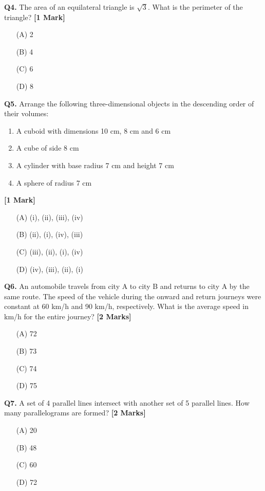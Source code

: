 \documentclass[11pt]{article}
\newcommand{\questiona}[2]{
    \noindent\textbf{Q#2.} #1 \hfill \textbf{[1 Mark]}
}
\newcommand{\questionb}[2]{
    \noindent\textbf{Q#2.} #1 \hfill \textbf{[2 Marks]}
}
\begin{document}
\questiona{The area of an equilateral triangle is \(\sqrt{3}\). What is the perimeter of the triangle?}{4}
\begin{enumerate}
    \item[(A)] 2  
    \item[(B)] 4  
    \item[(C)] 6  
    \item[(D)] 8  
\end{enumerate}
\vspace{0.5cm}

\questiona{Arrange the following three-dimensional objects in the descending order of their volumes:
\begin{enumerate}
    \item A cuboid with dimensions 10 cm, 8 cm and 6 cm
    \item A cube of side 8 cm
    \item A cylinder with base radius 7 cm and height 7 cm
    \item A sphere of radius 7 cm
\end{enumerate}}{5}
\begin{enumerate}
    \item[(A)] (i), (ii), (iii), (iv)  
    \item[(B)] (ii), (i), (iv), (iii)  
    \item[(C)] (iii), (ii), (i), (iv)  
    \item[(D)] (iv), (iii), (ii), (i)  
\end{enumerate}
\vspace{0.5cm}

\questionb{An automobile travels from city A to city B and returns to city A by the same route. The speed of the vehicle during the onward and return journeys were constant at 60 km/h and 90 km/h, respectively. What is the average speed in km/h for the entire journey?}{6}
\begin{enumerate}
    \item[(A)] 72  
    \item[(B)] 73  
    \item[(C)] 74  
    \item[(D)] 75  
\end{enumerate}
\vspace{0.5cm}

\questionb{A set of 4 parallel lines intersect with another set of 5 parallel lines. How many parallelograms are formed?}{7}
\begin{enumerate}
    \item[(A)] 20  
    \item[(B)] 48  
    \item[(C)] 60  
    \item[(D)] 72  
\end{enumerate}
\vspace{0.5cm}
\end{document}
